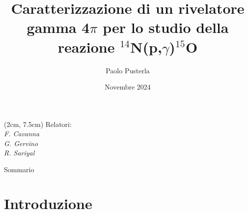 \documentclass [xcolor=svgnames, 9pt] {beamer}
\title[P. Pusterla]{Caratterizzazione di un rivelatore gamma 4$\pi$ per lo studio della reazione $^{14}$N(p,$\gamma$)$^{15}$O}
\author[Fisica]{Paolo Pusterla}
\institute[UniTo]{Università degli Studi di Torino}
\date{Novembre 2024}
\begin{document}
	\begin{frame}
		\titlepage
		\begin{textblock*}{6cm}(2cm, 7.5cm) %
			\large 
			Relatori:\\
			\textit{F. Cavanna}\\
			\textit{G. Gervino}\\
			\textit{R. Sariyal}
		\end{textblock*}
	\end{frame}
	
	\begin{frame}{Sommario}
		\tableofcontents
	\end{frame}
	
\section{Introduzione}
\end{document}
